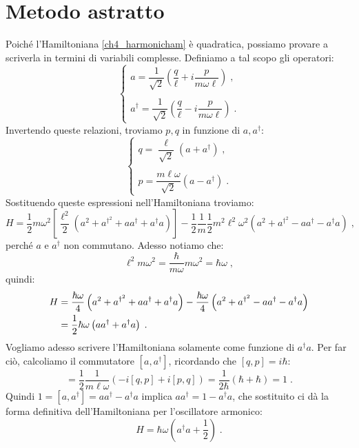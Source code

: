 \documentclass[12pt,a4paper]{report}
\theoremstyle{definition}
\numberwithin{equation}{section}
\newcommand{\adj}[1]{#1^{\dagger}}
\begin{document}
\section{Metodo astratto}
Poiché l'Hamiltoniana \eqref{ch4_harmonicham} è quadratica, possiamo provare a scriverla in termini di variabili complesse. Definiamo a tal scopo gli operatori:
\begin{equation}
\begin{cases}
a=\dfrac{1}{\sqrt{2}}\left(\dfrac{q}{\ell}+i\dfrac{p}{m\omega\ell}\right)\;, \\
\\
\adj{a}=\dfrac{1}{\sqrt{2}}\left(\dfrac{q}{\ell}-i\dfrac{p}{m\omega\ell}\right)\;.
\end{cases}
\end{equation}
Invertendo queste relazioni, troviamo $p,q$ in funzione di $a,\adj{a}$:
\begin{equation}
\begin{cases}
q=\dfrac{\ell}{\sqrt{2}}\left(a+\adj{a}\right)\;, \\
\\
p=\dfrac{m\ell\omega}{\sqrt{2}}\left(a-\adj{a}\right)\;.
\end{cases}
\end{equation}
Sostituendo queste espressioni nell'Hamiltoniana troviamo:
$$
H=\frac{1}{2}m\omega^2\left[\frac{\ell^2}{2}\left(a^2+a^{\dagger^2}+a\adj{a}+\adj{a}a\right)\right]-\frac{1}{2}\frac{1}{m}\frac{1}{2}m^2\ell^2\omega^2\left(a^2+a^{\dagger^2}-a\adj{a}-\adj{a}a\right)\;,
$$
perché $a$ e $\adj{a}$ non commutano. Adesso notiamo che:
$$
\ell^2m\omega^2=\frac{\hbar}{m\omega}m\omega^2=\hbar\omega\;,
$$
quindi:
\begin{align}
H &= \frac{\hbar\omega}{4}\left(a^2+a^{\dagger^2}+a\adj{a}+\adj{a}a\right)-\frac{\hbar\omega}{4}\left(a^2+a^{\dagger^2}-a\adj{a}-\adj{a}a\right) \notag \\
&= \frac{1}{2}\hbar\omega\left(a\adj{a}+\adj{a}a\right)\;.
\end{align}
Vogliamo adesso scrivere l'Hamiltoniana solamente come funzione di $\adj{a}a$. Per far ciò, calcoliamo il commutatore $[a,\adj{a}]$, ricordando che $[q,p]=i\hbar$:
\begin{equation}
[a,\adj{a}]=\frac{1}{2}\frac{1}{m\ell\omega}\left(-i[q,p]+i[p,q]\right)=\frac{1}{2\hbar}(\hbar+\hbar)=1\;.
\end{equation}
Quindi $1=[a,\adj{a}]=a\adj{a}-\adj{a}a$ implica $a\adj{a}=1-\adj{a}a$, che sostituito ci dà la forma definitiva dell'Hamiltoniana per l'oscillatore armonico:
\begin{equation}
H=\hbar\omega\left(\adj{a}a+\frac{1}{2}\right)\;.
\end{equation}
\end{document}
